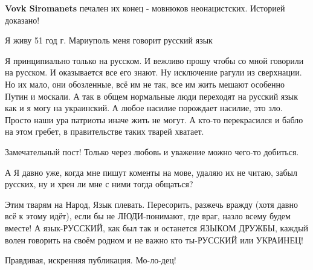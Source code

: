 \begin{itemize}
\begin{itemize}
\textbf{Vovk Siromanets} печален их конец - мовнюков неонацистских. Историей доказано!
\end{itemize}


Я живу 51 год г. Мариуполь меня говорит русский язык



Я принципиально только на русском. И вежливо прошу чтобы со мной говорили на
русском. И оказывается все его знают. Ну исключение рагули из сверхнации. Но их
мало, они обозленные, всё им не так, все им жить мешают особенно Путин и
москали. А так в общем нормальные люди переходят на русский язык как и я могу
на украинский. А любое насилие порождает насилие, это зло. Просто наши ура
патриоты иначе жить не могут. А кто-то перекрасился и бабло на этом гребет, в
правительстве таких тварей хватает.



Замечательный пост! Только через любовь и уважение можно чего-то добиться.





А Я давно уже, когда мне пишут коменты на мове, удаляю их не читаю, забыл
русских, ну и хрен ли мне с ними тогда общаться?



Этим тварям на Народ, Язык плевать. Пересорить, разжечь вражду (хотя давно всё
к этому идёт), если бы не ЛЮДИ-понимают, где враг, назло всему будем вместе! А
язык-РУССКИЙ, как был так и останется ЯЗЫКОМ ДРУЖБЫ, каждый волен говорить на
своём родном и не важно кто ты-РУССКИЙ или УКРАИНЕЦ!




Правдивая, искренняя публикация. Мо-ло-дец!



\end{itemize}
